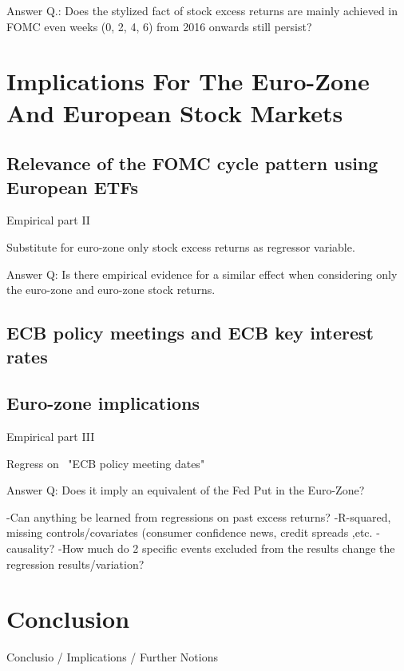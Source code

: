Answer Q.: Does the stylized fact of stock excess returns are mainly achieved in FOMC even weeks (0,  2,  4,  6) from 2016 onwards still persist?

\newpage


\chapter{Implications For The Euro-Zone And European Stock Markets}

\newpage

\section{Relevance of the FOMC cycle pattern using European ETFs}

Empirical part II

Substitute for euro-zone only stock excess returns as regressor variable.


Answer Q: Is there empirical evidence for a similar effect when considering only the euro-zone and euro-zone stock returns. 


\newpage


\section{ECB policy meetings and ECB key interest rates}

\newpage

\section{Euro-zone implications}

Empirical part III

Regress on ~"ECB policy meeting dates"

Answer Q: Does it imply an equivalent of the Fed Put in the Euro-Zone?


-Can anything be learned from regressions on past excess returns?
-R-squared,  missing controls/covariates (consumer confidence news, credit spreads ,etc.
-causality?
-How much do 2 specific events excluded from the results change the regression results/variation?


\newpage

\chapter{Conclusion}

Conclusio / Implications / Further Notions


